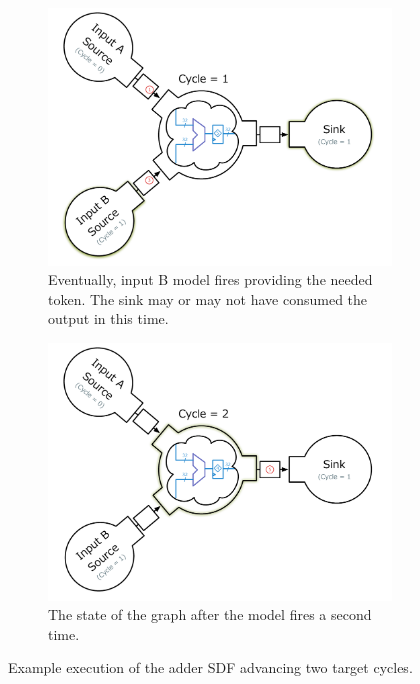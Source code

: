 \begin{figure}
    \begin{subfigure}[t]{0.45\textwidth}
	    \centering
        \includegraphics[width=\linewidth]{figures/adder-ex3.pdf}
        \caption{Eventually, input B model fires providing the needed token. The sink may or
        may not have consumed the output in this time.}
    \end{subfigure}\hspace{0.1\linewidth}
    \begin{subfigure}[t]{0.45\textwidth}
	    \centering
        \includegraphics[width=\linewidth]{figures/adder-ex4.pdf}
        \caption{The state of the graph after the model fires a second time.}
    \end{subfigure}
    \caption{Example execution of the adder SDF advancing two target cycles.}
    \label{ref:adder-execution}
\end{figure}

